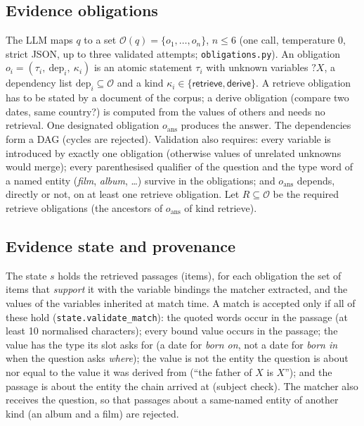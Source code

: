 \subsection{Evidence obligations}
The LLM maps $q$ to a set $\mathcal O(q)=\{o_1,\dots,o_n\}$, $n\le 6$ (one call, temperature $0$, strict JSON, up to three
validated attempts; \texttt{obligations.py}). An obligation $o_i=(\tau_i,\ \mathrm{dep}_i,\ \kappa_i)$ is an atomic statement $\tau_i$ with
unknown variables $?X$, a dependency list $\mathrm{dep}_i\subseteq\mathcal O$ and a kind
$\kappa_i\in\{\textsf{retrieve},\textsf{derive}\}$. A \textsf{retrieve} obligation has to be stated by a document of the
corpus; a \textsf{derive} obligation (compare two dates, same country?) is computed from the values of others and needs no retrieval.
One designated obligation $o_{\mathrm{ans}}$ produces the answer. The dependencies form a DAG (cycles are rejected). Validation also
requires: every variable is introduced by exactly one obligation (otherwise values of unrelated unknowns would merge); every
parenthesised qualifier of the question and the type word of a named entity (\emph{film}, \emph{album}, \dots) survive in the obligations; and
$o_{\mathrm{ans}}$ depends, directly or not, on at least one \textsf{retrieve} obligation. Let $R\subseteq\mathcal O$ be the required
\textsf{retrieve} obligations (the ancestors of $o_{\mathrm{ans}}$ of kind \textsf{retrieve}).

\subsection{Evidence state and provenance}
The state $s$ holds the retrieved passages (items), for each obligation the set of items that \emph{support} it with the variable
bindings the matcher extracted, and the values of the variables inherited at match time. A match is accepted only if all of these hold
(\texttt{state.validate\_match}): the quoted words occur in the passage (at least 10 normalised characters); every bound value occurs in the passage;
the value has the type its slot asks for (a date for \emph{born on}, not a date for \emph{born in} when the question asks \emph{where});
the value is not the entity the question is about nor equal to the value it was derived from (``the father of $X$ is $X$''); and the passage is
about the entity the chain arrived at (subject check). The matcher also receives the question, so that passages about a same-named entity of
another kind (an album and a film) are rejected.


